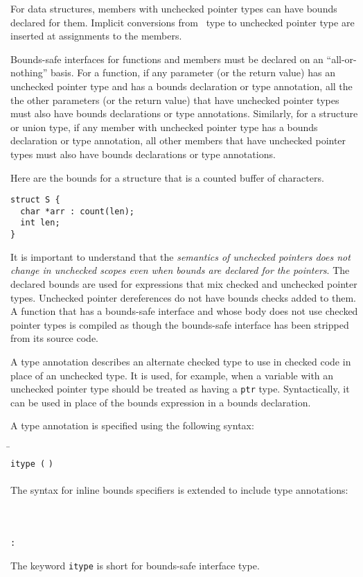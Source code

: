 For data structures, members with unchecked pointer types can
have bounds declared for them.   Implicit conversions from \arrayptr\ 
type to unchecked pointer type are inserted at assignments to the members.

Bounds-safe interfaces for functions and members must be
declared on an ``all-or-nothing'' basis.
For a function, if any parameter (or the return value) has an unchecked pointer
type and has a bounds declaration or type annotation, all the
the other parameters (or the return value) that have unchecked
pointer types must also have bounds declarations or type
annotations.  Similarly, for a structure or union type,
if any member with unchecked pointer type
has a bounds declaration or type annotation, all other members
that have unchecked pointer types must also have bounds declarations
or type annotations.

Here are the bounds for a structure that is a counted buffer of
characters.
\begin{lstlisting}
struct S {
  char *arr : count(len);
  int len;
}
\end{lstlisting}

It is important to understand that the \emph{semantics of unchecked
pointers does not change in unchecked scopes even when bounds are
declared for the pointers}. The declared bounds are used  for expressions
that mix checked and unchecked pointer types. Unchecked pointer dereferences do not
have bounds checks added to them. A function that has a bounds-safe
interface and whose body does not use checked pointer
types is compiled as though the bounds-safe interface has been
stripped from its source code.

A type annotation describes an alternate checked type to use in checked code
in place of an unchecked type. It is used, for example, when a variable with
an unchecked pointer type should be treated as having
a \texttt{ptr} type.  Syntactically, it can
be used in place of the  bounds expression in a bounds declaration.

A type annotation is specified using the following syntax:

\begin{tabbing}
\= \\
\>\texttt{itype (}  \texttt{)}\\
\\
The syntax for inline bounds specifiers is extended to include
type annotations:\\
\\
\\
\> \var{\ldots{}}\\
\>\texttt{:} 
\end{tabbing}
The keyword \texttt{itype} is short for bounds-safe  interface type.


